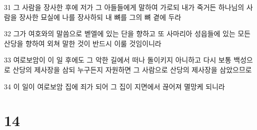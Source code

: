 \par 31 그 사람을 장사한 후에 저가 그 아들들에게 말하여 가로되 내가 죽거든 하나님의 사람을 장사한 묘실에 나를 장사하되 내 뼈를 그의 뼈 곁에 두라
\par 32 그가 여호와의 말씀으로 벧엘에 있는 단을 향하고 또 사마리아 성읍들에 있는 모든 산당을 향하여 외쳐 말한 것이 반드시 이룰 것임이니라
\par 33 여로보암이 이 일 후에도 그 악한 길에서 떠나 돌이키지 아니하고 다시 보통 백성으로 산당의 제사장을 삼되 누구든지 자원하면 그 사람으로 산당의 제사장을 삼았으므로
\par 34 이 일이 여로보암 집에 죄가 되어 그 집이 지면에서 끊어져 멸망케 되니라

\chapter{14}

